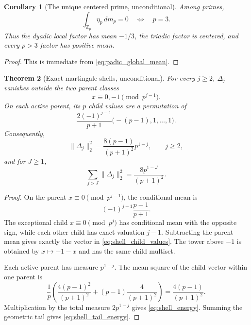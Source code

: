 \documentclass[11pt]{amsart}
\numberwithin{equation}{section}
\theoremstyle{plain}
\newtheorem{theorem}{Theorem}[section]
\newtheorem{corollary}[theorem]{Corollary}
\theoremstyle{definition}
\theoremstyle{remark}
\newcommand{\Z}{\mathbb Z}
\begin{document}
\begin{corollary}[The unique centered prime, unconditional]
\label{cor:unique_centered_prime}
Among primes,
\begin{equation}
\int_{\Z_p}\eta_p\,dm_p=0
\quad\Longleftrightarrow\quad
p=3.
\label{eq:unique_centered_prime}
\end{equation}
Thus the dyadic local factor has mean $-1/3$, the triadic factor is centered, and every $p>3$ factor has positive mean.
\end{corollary}

\begin{proof}
This is immediate from \eqref{eq:padic_global_mean}.
\end{proof}

\begin{theorem}[Exact martingale shells, unconditional]
\label{thm:exact_shells}
For every $j\ge2$, $\Delta_j$ vanishes outside the two parent classes
\begin{equation}
x\equiv0,-1\pmod{p^{j-1}}.
\label{eq:active_parents}
\end{equation}
On each active parent, its $p$ child values are a permutation of
\begin{equation}
\frac{2(-1)^{j-1}}{p+1}\bigl(-(p-1),1,\ldots,1\bigr).
\label{eq:shell_child_values}
\end{equation}
Consequently,
\begin{equation}
\|\Delta_j\|_2^2
=\frac{8(p-1)}{(p+1)^2}p^{1-j},
\qquad j\ge2,
\label{eq:shell_energy}
\end{equation}
and for $J\ge1$,
\begin{equation}
\sum_{j>J}\|\Delta_j\|_2^2
=\frac{8p^{1-J}}{(p+1)^2}.
\label{eq:shell_tail_energy}
\end{equation}
\end{theorem}

\begin{proof}
On the parent $x\equiv0\pmod{p^{j-1}}$, the conditional mean is
\begin{equation}
(-1)^{j-1}\frac{p-1}{p+1}.
\label{eq:parent_mean_shell}
\end{equation}
The exceptional child $x\equiv0\pmod{p^j}$ has conditional mean with the opposite sign, while each other child has exact valuation $j-1$.  Subtracting the parent mean gives exactly the vector in \eqref{eq:shell_child_values}.  The tower above $-1$ is obtained by $x\mapsto-1-x$ and has the same child multiset.

Each active parent has measure $p^{1-j}$.  The mean square of the child vector within one parent is
\begin{equation}
\frac1p\left(
\frac{4(p-1)^2}{(p+1)^2}
+(p-1)\frac4{(p+1)^2}
\right)
=\frac{4(p-1)}{(p+1)^2}.
\label{eq:child_mean_square}
\end{equation}
Multiplication by the total measure $2p^{1-j}$ gives \eqref{eq:shell_energy}.  Summing the geometric tail gives \eqref{eq:shell_tail_energy}.
\end{proof}
\end{document}
